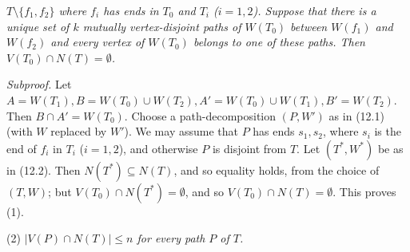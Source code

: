 \noindent \textit{$T \setminus \{f_1, f_2\}$ where $f_i$ has ends in $T_0$ and $T_i$ ($i = 1, 2$). Suppose that there is a unique set of $k$ mutually vertex-disjoint paths of $W(T_0)$ between $W(f_1)$ and $W(f_2)$ and every vertex of $W(T_0)$ belongs to one of these paths. Then $V(T_0) \cap N(T) = \emptyset$.}

\textit{Subproof.} Let $A = W(T_1), B = W(T_0) \cup W(T_2), A' = W(T_0) \cup W(T_1), B' = W(T_2)$. Then $B \cap A' = W(T_0)$. Choose a path-decomposition $(P, W')$ as in (12.1) (with $W$ replaced by $W'$). We may assume that $P$ has ends $s_1, s_2$, where $s_i$ is the end of $f_i$ in $T_i$ ($i = 1, 2$), and otherwise $P$ is disjoint from $T$. Let $(T^*, W^*)$ be as in (12.2). Then $N(T^*) \subseteq N(T)$, and so equality holds, from the choice of $(T, W)$; but $V(T_0) \cap N(T^*) = \emptyset$, and so $V(T_0) \cap N(T) = \emptyset$. This proves (1).

\hspace*{12pt}(2) \textit{$|V(P) \cap N(T)| \le n$ for every path $P$ of $T$.}

